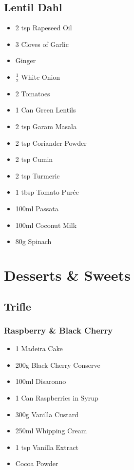 \documentclass[11pt, english]{article}
\begin{document}
\newpage

	\subsection{Lentil Dahl}

	\begin{itemize}
        \setlength\itemsep{0cm}
                \item 2 tsp Rapeseed Oil
		\item 3 Cloves of Garlic
		\item Ginger
		\item $\frac{1}{2}$ White Onion
		\item 2 Tomatoes
		\item 1 Can Green Lentils
		\item 2 tsp Garam Masala
		\item 2 tsp Coriander Powder
		\item 2 tsp Cumin
		\item 2 tsp Turmeric
		\item 1 tbsp Tomato Pur\'{e}e
		\item 100ml Passata
		\item 100ml Coconut Milk
		\item 80g Spinach
        \end{itemize}

\newpage

\section{Desserts \& Sweets}

	\subsection{Trifle}

		\subsubsection*{Raspberry \& Black Cherry}

	\begin{itemize}
        \setlength\itemsep{0cm}
                \item 1 Madeira Cake
		\item 200g Black Cherry Conserve
		\item 100ml Disaronno
		\item 1 Can Raspberries in Syrup
		\item 300g Vanilla Custard
		\item 250ml Whipping Cream
		\item 1 tsp Vanilla Extract
		\item Cocoa Powder
        \end{itemize}		
\end{document}
